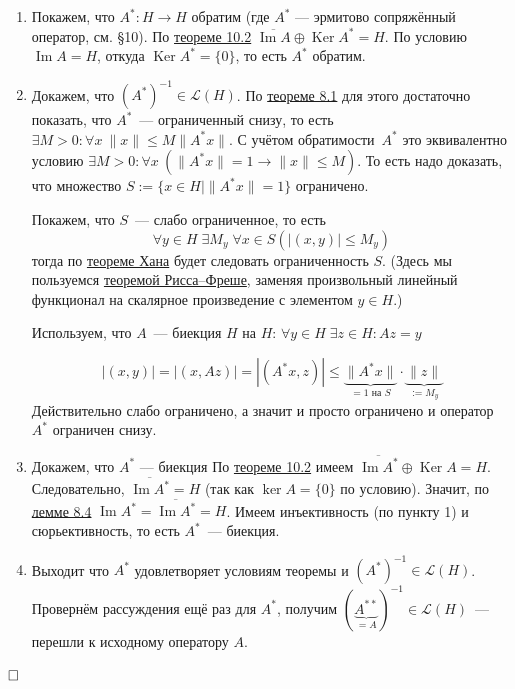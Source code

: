 \documentclass[12pt, a4paper]{article}
\DeclareMathOperator{\im}{Im}
\DeclareMathOperator{\Ker}{Ker}
\newcommand{\QED}{$\hfill\square$}
\renewcommand{\le}{\leqslant}  %
\renewcommand{\L}{\mathcal{L}}   %
\begin{document}
\begin{enumerate}
    \item Покажем, что $A^* \colon H \to H$ обратим (где $A^*$ --- эрмитово сопряжённый оператор, см. §10).
    По \hyperref[th:10-2]{теореме 10.2} $\overline{\im A} \oplus \Ker A^* = H$. По условию $\im A = H$, откуда $\Ker A^* = \{0\}$, то есть $A^*$ обратим.

    \item Докажем, что $(A^*)^{-1} \in \mathcal{L}(H)$. По \hyperref[th:8-1]{теореме 8.1} для этого достаточно показать, что
    $A^*$~--- ограниченный снизу, то есть 
    $\exists M > 0\colon \forall x \ \|x\| \le M\|A^* x\|$. С учётом обратимости~$A^*$ это эквивалентно условию $\exists M > 0\colon \forall x \ (\|A^* x\| = 1 \rightarrow \|x\| \le M)$.
    То есть надо доказать, что множество $S := \{x \in H \mid \|A^*x\| = 1\}$ ограничено.
    
    Покажем, что $S$~--- слабо ограниченное, то есть
    \[
    \forall y \in H\; \exists M_y\; \forall x \in S \left(|(x, y)| \le M_y \right)
    \]
    тогда по \hyperref[th:7-3]{теореме Хана} будет следовать ограниченность $S$. (Здесь мы пользуемся \hyperref[th:6-1]{теоремой Рисса--Фреше}, заменяя произвольный линейный функционал на скалярное произведение с элементом $y \in H$.)

    Используем, что $A$~--- биекция $H$ на $H$: $\forall y \in H \; \exists z \in H \colon Az = y$

    \[ |(x, y)| = |(x, Az)| = |(A^*x, z)| \le \underbrace{\|A^* x\|}_{=1\text{ на $S$}} \cdot \underbrace{\|z\|}_{:=M_y}\]
    Действительно слабо ограничено, а значит и просто ограничено и оператор $A^*$ ограничен снизу.

    \item Докажем, что $A^*$ --- биекция
    По \hyperref[th:10-2]{теореме 10.2} имеем 
    $\overline{\im A^*} \oplus \Ker A = H$. Следовательно, $\overline{\im A^*} = H$ (так как $\ker A = \{0\}$ по условию). Значит, по \hyperref[8.4_lemma]{лемме 8.4} $\im A^* = \overline{\im A^*} = H$. Имеем инъективность (по пункту 1) и сюрьективность, то есть $A^*$~--- биекция.

    \item Выходит что $A^*$ удовлетворяет условиям теоремы и $(A^*)^{-1} \in \L(H)$.
    Провернём рассуждения ещё раз для $A^*$, получим $(\underbrace{A^{**}}_{=A})^{-1} \in \L(H)$~--- перешли к исходному оператору $A$. 
\end{enumerate}

\QED
\end{document}
